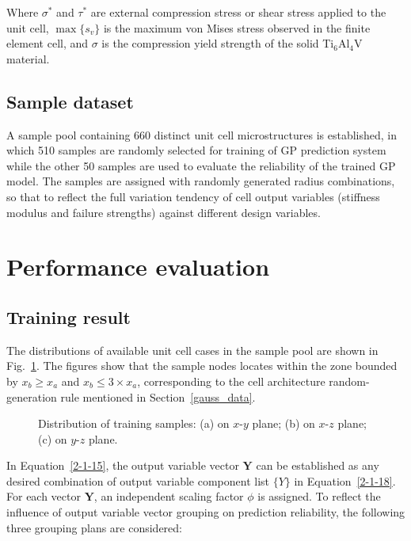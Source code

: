 \documentclass[12pt]{extbook}
\begin{document}
Where $\sigma^*$ and $\tau^*$ are external compression stress or shear stress applied to the unit cell, $\max{\{s_v\}}$ is the maximum von Mises stress observed in the finite element cell, and ${\sigma}$ is the compression yield strength of the solid Ti$_6$Al$_4$V material.\\

\subsection{Sample dataset}

A sample pool containing 660 distinct unit cell microstructures is established, in which 510 samples are randomly selected for training of GP prediction system while the other 50 samples are used to evaluate the reliability of the trained GP model. The samples are assigned with randomly generated radius combinations, so that to reflect the full variation tendency of cell output variables (stiffness modulus and failure strengths) against different design variables.\\


\section{Performance evaluation}
\label{gauss_perf}

\subsection{Training result}

The distributions of available unit cell cases in the sample pool are shown in Fig.~\ref{sample}. The figures show that the sample nodes locates within the zone bounded by $x_b \geq x_a$ and $x_b \leq 3 \times x_a$, corresponding to the cell architecture random-generation rule mentioned in Section~\ref{gauss_data}.\\

\begin{figure}[htbp]
\centering
{}
\caption{Distribution of training samples: (a) on $x$-$y$ plane; (b) on $x$-$z$ plane; (c) on $y$-$z$ plane.}
\label{sample}
\end{figure}

In Equation~\ref{2-1-15}, the output variable vector $\bm{Y}$ can be established as any desired combination of output variable component list $\{Y\}$ in Equation~\ref{2-1-18}. For each vector $\bm{Y}$, an independent scaling factor $\phi$ is assigned. To reflect the influence of output variable vector grouping on prediction reliability, the following three grouping plans are considered:
\end{document}
